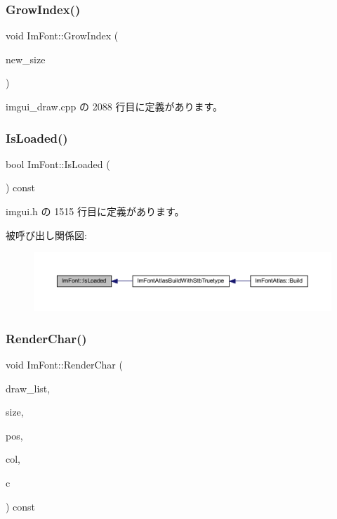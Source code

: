 \subsubsection{\texorpdfstring{Grow\+Index()}{GrowIndex()}}
{\footnotesize\ttfamily void Im\+Font\+::\+Grow\+Index (\begin{DoxyParamCaption}\item[{int}]{new\+\_\+size }\end{DoxyParamCaption})}



 imgui\+\_\+draw.\+cpp の 2088 行目に定義があります。

\mbox{\label{struct_im_font_a97dafa61cc94e84be396d69b0d42b1ce}} 
\subsubsection{\texorpdfstring{Is\+Loaded()}{IsLoaded()}}
{\footnotesize\ttfamily bool Im\+Font\+::\+Is\+Loaded (\begin{DoxyParamCaption}{ }\end{DoxyParamCaption}) const\hspace{0.3cm}{\ttfamily [inline]}}



 imgui.\+h の 1515 行目に定義があります。

被呼び出し関係図\+:\nopagebreak
\begin{figure}[H]
\begin{center}
\leavevmode
\includegraphics[width=350pt]{struct_im_font_a97dafa61cc94e84be396d69b0d42b1ce_icgraph}
\end{center}
\end{figure}
\mbox{\label{struct_im_font_af602fe8f445ae4142436ee3e6baa3ede}} 
\subsubsection{\texorpdfstring{Render\+Char()}{RenderChar()}}
{\footnotesize\ttfamily void Im\+Font\+::\+Render\+Char (\begin{DoxyParamCaption}\item[{\mbox{\hyperlink{struct_im_draw_list}{Im\+Draw\+List}} $\ast$}]{draw\+\_\+list,  }\item[{float}]{size,  }\item[{\mbox{\hyperlink{struct_im_vec2}{Im\+Vec2}}}]{pos,  }\item[{\mbox{\hyperlink{imgui_8h_a118cff4eeb8d00e7d07ce3d6460eed36}{Im\+U32}}}]{col,  }\item[{unsigned short}]{c }\end{DoxyParamCaption}) const}




